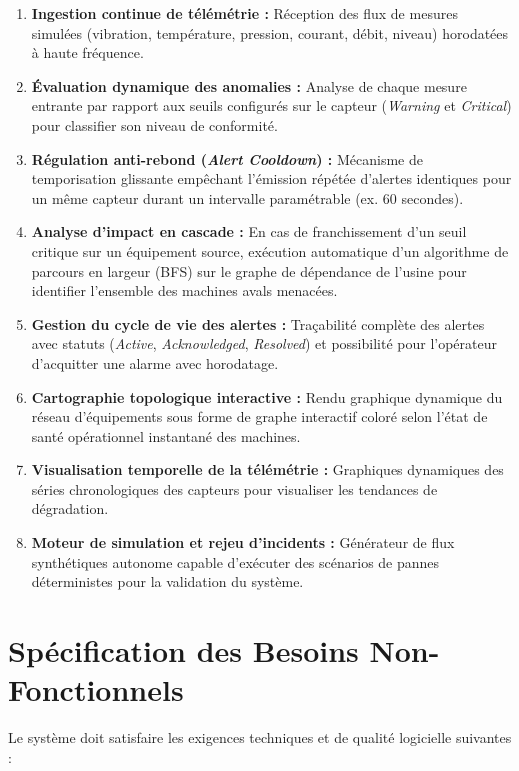 \begin{enumerate}[label=\textbf{BF.\arabic* ---}, leftmargin=2.2cm]
    \item \textbf{Ingestion continue de télémétrie :} Réception des flux de mesures simulées (vibration, température, pression, courant, débit, niveau) horodatées à haute fréquence.
    \item \textbf{Évaluation dynamique des anomalies :} Analyse de chaque mesure entrante par rapport aux seuils configurés sur le capteur (\textit{Warning} et \textit{Critical}) pour classifier son niveau de conformité.
    \item \textbf{Régulation anti-rebond (\textit{Alert Cooldown}) :} Mécanisme de temporisation glissante empêchant l'émission répétée d'alertes identiques pour un même capteur durant un intervalle paramétrable (ex. 60 secondes).
    \item \textbf{Analyse d'impact en cascade :} En cas de franchissement d'un seuil critique sur un équipement source, exécution automatique d'un algorithme de parcours en largeur (BFS) sur le graphe de dépendance de l'usine pour identifier l'ensemble des machines avals menacées.
    \item \textbf{Gestion du cycle de vie des alertes :} Traçabilité complète des alertes avec statuts (\textit{Active}, \textit{Acknowledged}, \textit{Resolved}) et possibilité pour l'opérateur d'acquitter une alarme avec horodatage.
    \item \textbf{Cartographie topologique interactive :} Rendu graphique dynamique du réseau d'équipements sous forme de graphe interactif coloré selon l'état de santé opérationnel instantané des machines.
    \item \textbf{Visualisation temporelle de la télémétrie :} Graphiques dynamiques des séries chronologiques des capteurs pour visualiser les tendances de dégradation.
    \item \textbf{Moteur de simulation et rejeu d'incidents :} Générateur de flux synthétiques autonome capable d'exécuter des scénarios de pannes déterministes pour la validation du système.
\end{enumerate}

\section{Spécification des Besoins Non-Fonctionnels}

Le système doit satisfaire les exigences techniques et de qualité logicielle suivantes :

